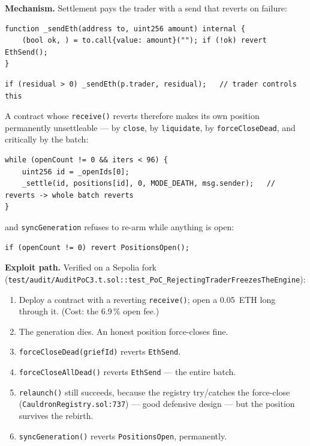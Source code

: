 \documentclass[10pt,a4paper]{article}
\newcommand{\code}[1]{\texttt{\small #1}}
\begin{document}
\textbf{Mechanism.} Settlement pays the trader with a send that reverts on
failure:

\begin{lstlisting}[firstnumber=993]
function _sendEth(address to, uint256 amount) internal {
    (bool ok, ) = to.call{value: amount}(""); if (!ok) revert EthSend();
}
\end{lstlisting}

\begin{lstlisting}[firstnumber=858]
if (residual > 0) _sendEth(p.trader, residual);   // trader controls this
\end{lstlisting}

\noindent A contract whose \code{receive()} reverts therefore makes its own
position permanently unsettleable --- by \code{close}, by \code{liquidate}, by
\code{forceCloseDead}, and critically by the batch:

\begin{lstlisting}[firstnumber=709]
while (openCount != 0 && iters < 96) {
    uint256 id = _openIds[0];
    _settle(id, positions[id], 0, MODE_DEATH, msg.sender);   // reverts -> whole batch reverts
}
\end{lstlisting}

\noindent and \code{syncGeneration} refuses to re-arm while anything is open:

\begin{lstlisting}[firstnumber=728]
if (openCount != 0) revert PositionsOpen();
\end{lstlisting}

\textbf{Exploit path.} Verified on a Sepolia fork
(\code{test/audit/AuditPoC3.t.sol::test\_PoC\_RejectingTraderFreezesTheEngine}):

\begin{enumerate}
\item Deploy a contract with a reverting \code{receive()}; open a 0.05~ETH long
through it. (Cost: the 6.9\,\% open fee.)
\item The generation dies. An honest position force-closes fine.
\item \code{forceCloseDead(griefId)} reverts \code{EthSend}.
\item \code{forceCloseAllDead()} reverts \code{EthSend} --- the entire batch.
\item \code{relaunch()} still succeeds, because the registry try/catches the
force-close (\code{CauldronRegistry.sol:737}) --- good defensive design --- but
the position survives the rebirth.
\item \code{syncGeneration()} reverts \code{PositionsOpen}, permanently.
\end{enumerate}
\end{document}
